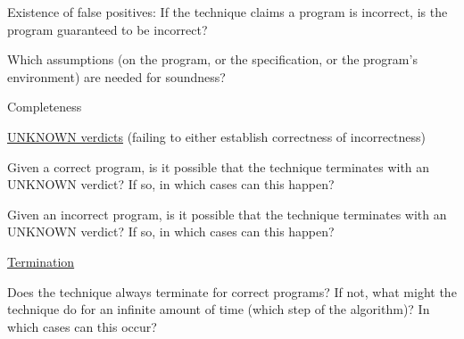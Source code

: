\documentclass[a4paper]{article}
\begin{document}
\begin{minipage}[t]{0.16\linewidth}
\begin{betterlist}
\begin{betterlist}
\begin{betterlist}
				\item Existence of false positives: If the technique claims a program is incorrect, is the program guaranteed to be incorrect?

			\end{betterlist}
			\item Which assumptions (on the program, or the specification, or the program’s environment) are needed for soundness?

		\end{betterlist}
		\item \alert{Completeness}
		\begin{betterlist}
			\item \underline{UNKNOWN verdicts} (failing to either establish correctness of incorrectness)
			\begin{betterlist}
				\item Given a correct program, is it possible that the technique terminates with an UNKNOWN verdict? If so, in which cases can this happen?

				\item Given an incorrect program, is it possible that the technique terminates with an UNKNOWN verdict? If so, in which cases can this happen?

			\end{betterlist}
			\item \underline{Termination}
			\begin{betterlist}
				\item Does the technique always terminate for correct programs? If not, what might the technique do for an infinite amount of time (which step of the algorithm)? In which cases can this occur?


\end{betterlist}
\end{betterlist}
\end{betterlist}
\end{minipage}
\end{document}
